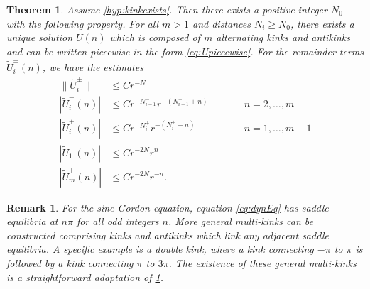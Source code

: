 \documentclass[12pt,reqno]{amsart}
\newtheorem{theorem}{Theorem}
\newtheorem{remark}{Remark}
\begin{document}
\begin{theorem}\label{th:KaKexists}
Assume \cref{hyp:kinkexists}. Then there exists a positive integer $N_0$ with the following property. For all $m > 1$ and distances $N_i \geq N_0$, there exists a unique solution $U(n)$ which is composed of $m$ alternating kinks and antikinks and can be written piecewise in the form \cref{eq:Upiecewise}. For the remainder terms $\tilde{U}_i^\pm(n)$, we have the estimates
\begin{equation}\label{eq:Uestimates}
\begin{aligned}
\|\tilde{U}_i^\pm\| &\leq C r^{-N} \\
| \tilde{U}_i^-(n) | &\leq C r^{-N_{i-1}^-} r^{-(N_{i-1}^- + n)} && \qquad n = 2, \dots, m\\
|\tilde{U}_i^+(n)| &\leq C r^{-N_i^+} r^{-(N_i^+ - n)} && \qquad n = 1, \dots, m-1 \\
| \tilde{U}_1^-(n) | &\leq C r^{-2N} r^{n} \\
|\tilde{U}_m^+(n)| &\leq C r^{-2N} r^{-n} .
\end{aligned}
\end{equation}
\end{theorem}

\begin{remark}\label{rem:SGmulitkinks}
For the sine-Gordon equation, equation \cref{eq:dynEq} has saddle equilibria at $n \pi$ for all odd integers $n$. More general multi-kinks can be constructed comprising kinks and antikinks which link any adjacent saddle equilibria. A specific example is a double kink, where a kink  connecting $-\pi$ to $\pi$ is followed by a kink connecting $\pi$ to $3 \pi$. The existence of these general multi-kinks is a straightforward adaptation of \cref{th:KaKexists}.
\end{remark}
\end{document}
